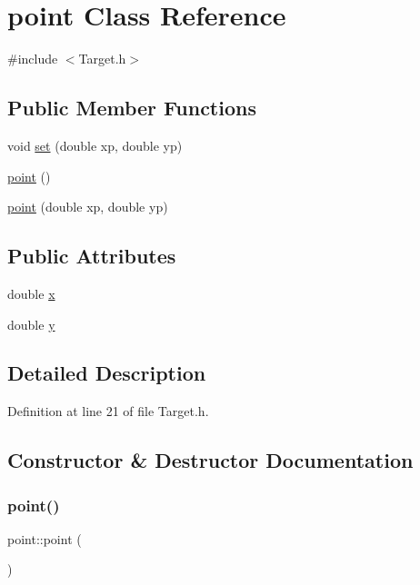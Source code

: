 \hypertarget{classpoint}{}\section{point Class Reference}
\label{classpoint}


{\ttfamily \#include $<$Target.\+h$>$}

\subsection*{Public Member Functions}
\begin{DoxyCompactItemize}
\item 
void \hyperlink{classpoint_a55ff7a33caa2783f318bc5f65746e32e}{set} (double xp, double yp)
\item 
\hyperlink{classpoint_a5fe21d4a4539320bf0f5caf1218d31c8}{point} ()
\item 
\hyperlink{classpoint_a35a81eb47d874ab0ad36577aad5fc464}{point} (double xp, double yp)
\end{DoxyCompactItemize}
\subsection*{Public Attributes}
\begin{DoxyCompactItemize}
\item 
double \hyperlink{classpoint_a9c6b34deaf4900ad4193c17935fd384a}{x}
\item 
double \hyperlink{classpoint_a613f8f0d7352731638b0094e1b958b87}{y}
\end{DoxyCompactItemize}


\subsection{Detailed Description}


Definition at line 21 of file Target.\+h.



\subsection{Constructor \& Destructor Documentation}
\mbox{\label{classpoint_a5fe21d4a4539320bf0f5caf1218d31c8}} 
\subsubsection{\texorpdfstring{point()}{point()}\hspace{0.1cm}{\footnotesize\ttfamily [1/2]}}
{\footnotesize\ttfamily point\+::point (\begin{DoxyParamCaption}{ }\end{DoxyParamCaption})\hspace{0.3cm}{\ttfamily [inline]}}



